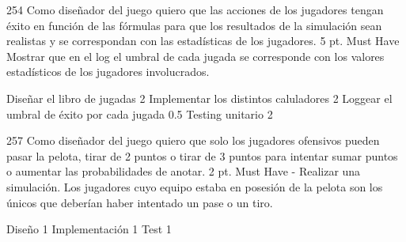\sprintstory
{254}
{Como diseñador del juego quiero que las acciones de los jugadores tengan éxito en función de las fórmulas para que los resultados de la simulación sean realistas y se correspondan con las estadísticas de los jugadores.}
{5 pt.}
{Must Have}
{}
{Mostrar que en el log el umbral de cada jugada se corresponde con los valores estadísticos de los jugadores involucrados.}

\begin{taskstable}
 \task
 {Diseñar el libro de jugadas}
 {2}
 \task
 {Implementar los distintos caluladores}
 {2}
 \task
 {Loggear el umbral de éxito por cada jugada}
 {0.5}
 \task
 {Testing unitario}
 {2}
\end{taskstable}

\vspace{1cm}


\sprintstory
{257}
{Como diseñador del juego quiero que solo los jugadores ofensivos pueden pasar la pelota, tirar de 2 puntos o tirar de 3 puntos para intentar sumar puntos o aumentar las probabilidades de anotar.}
{2 pt.}
{Must Have}
{-}
{Realizar una simulación. Los jugadores cuyo equipo estaba en posesión de la pelota son los únicos que deberían haber intentado un pase o un tiro.}

\begin{taskstable}
 \task
 {Diseño}
 {1}
 \task
 {Implementación}
 {1}
 \task
 {Test}
 {1}
\end{taskstable}

